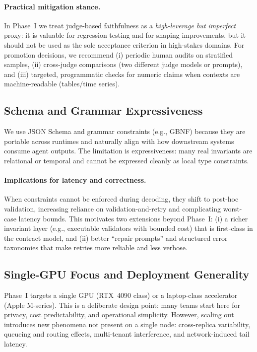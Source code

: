\documentclass[11pt]{article}
\begin{document}
\paragraph{Practical mitigation stance.}
In Phase~I we treat judge-based faithfulness as a \emph{high-leverage but imperfect} proxy:
it is valuable for regression testing and for shaping improvements, but it should not be used as the sole acceptance criterion in high-stakes domains.
For promotion decisions, we recommend (i) periodic human audits on stratified samples, (ii) cross-judge comparisons (two different judge models or prompts), and (iii) targeted, programmatic checks for numeric claims when contexts are machine-readable (tables/time series).

\subsection{Schema and Grammar Expressiveness}

We use JSON Schema and grammar constraints (e.g., GBNF) because they are portable across runtimes and naturally align with how downstream systems consume agent outputs.
The limitation is expressiveness: many real invariants are relational or temporal and cannot be expressed cleanly as local type constraints.

\paragraph{Implications for latency and correctness.}
When constraints cannot be enforced during decoding, they shift to post-hoc validation, increasing reliance on validation-and-retry and complicating worst-case latency bounds.
This motivates two extensions beyond Phase~I:
(i) a richer invariant layer (e.g., executable validators with bounded cost) that is first-class in the contract model, and
(ii) better ``repair prompts'' and structured error taxonomies that make retries more reliable and less verbose.

\subsection{Single-GPU Focus and Deployment Generality}

Phase~I targets a single GPU (RTX~4090 class) or a laptop-class accelerator (Apple M-series).
This is a deliberate design point: many teams start here for privacy, cost predictability, and operational simplicity.
However, scaling out introduces new phenomena not present on a single node: cross-replica variability, queueing and routing effects, multi-tenant interference, and network-induced tail latency.
\end{document}
